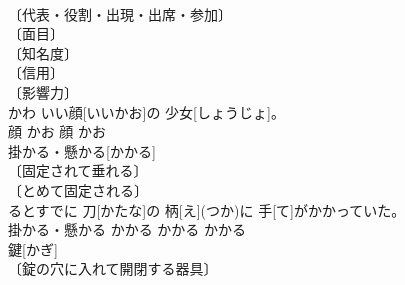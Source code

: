 \documentclass[8pt]{extreport}
\begin{document}
\begin{CJK}{UTF8}{min}
\\	〔代表・役割・出現・出席・参加〕 
\\	〔面目〕 
\\	〔知名度〕 
\\	〔信用〕 
\\	〔影響力〕 
\\	かわ いい顔[いいかお]の 少女[しょうじょ]。	
\\	顔	かお	顔	かお	
\\	掛かる・懸かる[かかる]	
\\	〔固定されて垂れる〕 
\\	〔とめて固定される〕 
\\	[⇒ひっかかる 
\\	〔上に置かれる〕 
\\	〔表面に注がれる〕 (液体が) 
\\	(砂などが) 
\\	〔表面が覆われる〕 
\\	〔まわりに巻きつく〕 
\\	〔道具が作動する・道具の機能が働く・機能がセットされる・契約により掛け金が払われる〕 
\\	〔陥る〕 
\\	〔釣針や網につかまる〕 
\\	〔時間・労力などが費やされる〕 
\\	〔金が〕 
\\	〔着手する〕 
\\	〔取り組む〕 
\\	〔不利益を被る〕 
\\	〔課せられる〕 
\\	〔攻撃をしかける〕 
\\	〔(弱者が)挑む〕 
\\	〔働きかけられる〕 
\\	〔作用が及ぶ〕 
\\	〔ある時期・箇所に至る〕 
\\	〔託される・委ねられる・そのこと次第で物事が決まる〕 
\\	〔受診する〕 
\\	〔(心・目などに)留まる〕 
\\	〔扱われる・処理される〕 
\\	〔上演・上映される〕 
\\	〔兼ねる・関連をもつ〕	見[み]るとすでに 刀[かたな]の 柄[え](つか)に 手[て]がかかっていた。	
\\	掛かる・懸かる	かかる	かかる	かかる	
\\	鍵[かぎ]	
\\	〔錠の穴に入れて開閉する器具〕 

\end{CJK}
\end{document}
